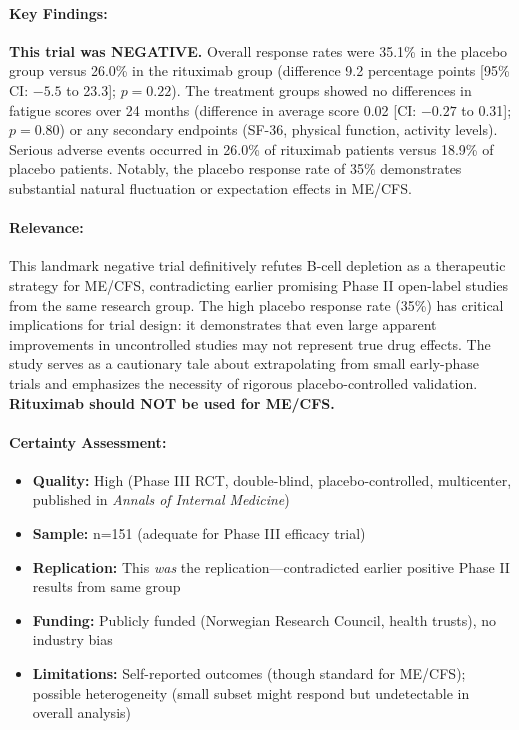\paragraph{Key Findings:}
\textbf{This trial was NEGATIVE.} Overall response rates were 35.1\% in the placebo group versus 26.0\% in the rituximab group (difference 9.2 percentage points [95\% CI: $-5.5$ to 23.3]; $p=0.22$). The treatment groups showed no differences in fatigue scores over 24 months (difference in average score 0.02 [CI: $-0.27$ to 0.31]; $p=0.80$) or any secondary endpoints (SF-36, physical function, activity levels). Serious adverse events occurred in 26.0\% of rituximab patients versus 18.9\% of placebo patients. Notably, the placebo response rate of 35\% demonstrates substantial natural fluctuation or expectation effects in ME/CFS.

\paragraph{Relevance:}
This landmark negative trial definitively refutes B-cell depletion as a therapeutic strategy for ME/CFS, contradicting earlier promising Phase II open-label studies from the same research group. The high placebo response rate (35\%) has critical implications for trial design: it demonstrates that even large apparent improvements in uncontrolled studies may not represent true drug effects. The study serves as a cautionary tale about extrapolating from small early-phase trials and emphasizes the necessity of rigorous placebo-controlled validation. \textbf{Rituximab should NOT be used for ME/CFS.}

\paragraph{Certainty Assessment:}
\begin{itemize}
    \item \textbf{Quality:} High (Phase III RCT, double-blind, placebo-controlled, multicenter, published in \emph{Annals of Internal Medicine})
    \item \textbf{Sample:} n=151 (adequate for Phase III efficacy trial)
    \item \textbf{Replication:} This \emph{was} the replication---contradicted earlier positive Phase II results from same group
    \item \textbf{Funding:} Publicly funded (Norwegian Research Council, health trusts), no industry bias
    \item \textbf{Limitations:} Self-reported outcomes (though standard for ME/CFS); possible heterogeneity (small subset might respond but undetectable in overall analysis)
\end{itemize}

